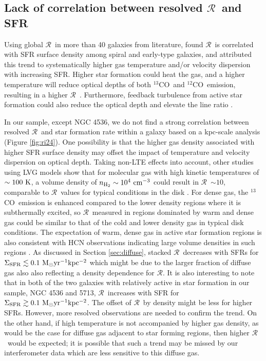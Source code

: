 \documentclass{emulateapj}
\def\ttco{\mbox{$^{13}$CO}}
\def\twco{\mbox{$^{12}$CO}}
\def\rtt{$\mathcal{R}$}
\def\un{\rm \ }
\begin{document}
\subsection{Lack of correlation between resolved \rtt \ and  SFR}\label{sec:davis}

Using global \rtt \ in more than 40 galaxies from literature, 
\citet{Davis2014} found \rtt \ is correlated with 
SFR surface density among spiral and early-type galaxies,  
and attributed this trend to
systematically 
higher gas temperature and/or velocity dispersion with increasing SFR. 
Higher star formation could heat the gas, and a higher 
temperature will reduce optical depths of both \ttco \ and \twco \  emission, 
resulting in a higher \rtt \ \citep{Aalto1995,Paglione2001}. 
Furthermore, feedback turbulence from active star formation  
could also reduce the optical depth and elevate the line ratio \citep{Aalto2010}. 

In our sample, except NGC 4536, we do not find a strong correlation between 
resolved \rtt \ and star formation rate within a galaxy 
based on a kpc-scale analysis (Figure \ref{fig:ri24}). 
One possibility is that the higher gas density associated with 
higher SFR surface density may offset the impact of temperature and
velocity dispersion on optical depth. 
Taking non-LTE effects into account, other studies using LVG models 
show that for molecular gas with high kinetic temperatures of $\sim 100 \rm \ K$, 
a volume density of $n_{\rm H_2} \sim 10^4 \rm \ cm^{-3}$ 
could result in \rtt \ $\sim 10$, comparable 
to \rtt \ values for typical conditions in the disk
\citep{Sakamoto1997, Meier2004}. 
For dense gas, the \ttco \ emission is enhanced compared to the 
lower density regions where it is subthermally excited, 
so \rtt \ measured in regions dominated by warm and dense gas could be
similar to that of the cold and lower density gas in typical disk conditions.   
The expectation of warm, dense gas in active star formation 
regions is also consistent with HCN observations
indicating large volume densities in such regions \citep[e.g.][]{Gao2004, Wu2005}. 
As discussed in Section \ref{sec:diffuse}, 
stacked \rtt \ decreases with SFRs 
for $\Sigma_{\mathrm{SFR}}\lesssim 0.1 \un  M_{\odot} yr^{-1} kpc^{-2}$ which might 
be due to the larger fraction of diffuse gas also 
also reflecting a density dependence for \rtt.
It is also interesting to note that in both of the two galaxies with 
relatively active in star formation 
in our sample, NGC 4536 and 5713, \rtt \ increases with SFR for 
$\Sigma_{\mathrm{SFR}}\gtrsim 0.1 \un  M_{\odot} yr^{-1} kpc^{-2} $.  
The offset of \rtt \ by density might be less for higher SFRs. 
However, more resolved observations are needed to confirm the trend.
On the other hand, if high temperature is not accompanied by higher 
gas density, as would be the case for diffuse gas adjacent to star forming 
regions, then higher \rtt \ would be expected; it is possible that 
such a trend may be missed by our interferometer data
which are less sensitive to this diffuse gas. 
\end{document}
